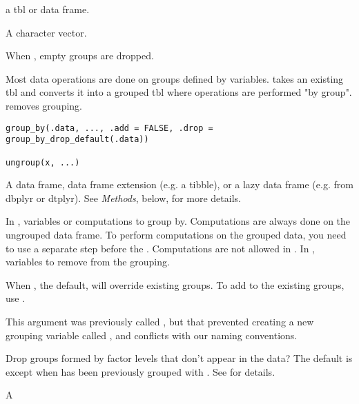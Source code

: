 \documentclass[a4paper]{book}
\begin{document}
%
\begin{Arguments}
\begin{ldescription}
\item[\code{data}] a tbl or data frame.

\item[\code{vars}] A character vector.

\item[\code{drop}] When , empty groups are dropped.
\end{ldescription}
\end{Arguments}
%
\begin{Description}
Most data operations are done on groups defined by variables.
 takes an existing tbl and converts it into a grouped tbl
where operations are performed "by group".  removes grouping.
\end{Description}
%
\begin{Usage}
\begin{verbatim}
group_by(.data, ..., .add = FALSE, .drop = group_by_drop_default(.data))

ungroup(x, ...)
\end{verbatim}
\end{Usage}
%
\begin{Arguments}
\begin{ldescription}
\item[\code{.data}] A data frame, data frame extension (e.g. a tibble), or a
lazy data frame (e.g. from dbplyr or dtplyr). See \emph{Methods}, below, for
more details.

\item[\code{...}] In , variables or computations to group by.
Computations are always done on the ungrouped data frame.
To perform computations on the grouped data, you need to use
a separate  step before the .
Computations are not allowed in .
In , variables to remove from the grouping.

\item[\code{.add}] When , the default,  will
override existing groups. To add to the existing groups, use
.

This argument was previously called , but that prevented
creating a new grouping variable called , and conflicts with
our naming conventions.

\item[\code{.drop}] Drop groups formed by factor levels that don't appear in the
data? The default is  except when  has been previously
grouped with . See  for details.

\item[\code{x}] A 
\end{ldescription}
\end{Arguments}
\end{document}
